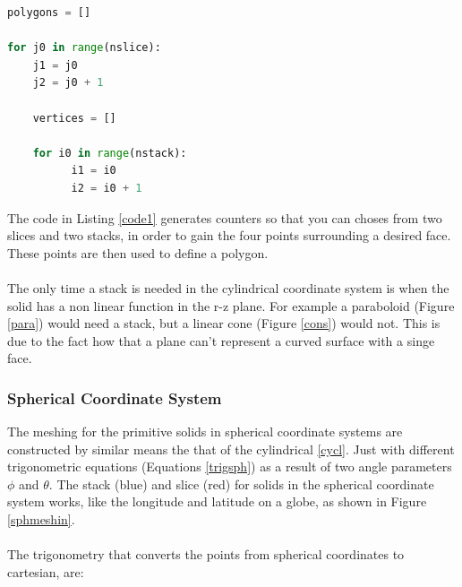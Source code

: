 \documentclass[12pt,a4paper]{article}
\begin{document}
\newpage
\begin{lstlisting}[language=Python, label=code1, caption=Basic method structure for Pyg4ometry primitive meshing of solids]
polygons = []

for j0 in range(nslice):
    j1 = j0
    j2 = j0 + 1
    
    vertices = []

    for i0 in range(nstack):
          i1 = i0
          i2 = i0 + 1     

\end{lstlisting}
The code in Listing \ref{code1} generates counters so that you can choses from two slices and two stacks, in order to gain the four points surrounding a desired face. These points are then used to define a polygon. 
\\\\
The only time a stack is needed in the cylindrical coordinate system is when the solid has a non linear function in the r-z plane. For example a paraboloid (Figure \ref{para}) would need a stack, but a linear cone (Figure \ref{cons}) would not. This is due to the fact how that a plane can't represent a curved surface with a singe face. 

\newpage
\subsubsection{Spherical Coordinate System}

The meshing for the primitive solids in spherical coordinate systems are constructed by similar means the that of the cylindrical \ref{cycl}. Just with different trigonometric equations (Equations \ref{trigsph}) as a result of two angle parameters $\phi$ and $\theta$. The stack (blue) and slice (red) for solids in the spherical coordinate system works, like the longitude and latitude on a globe, as shown in Figure \ref{sphmeshin}. 
\\\\
The trigonometry that converts the points from spherical coordinates to cartesian, are:
\end{document}

